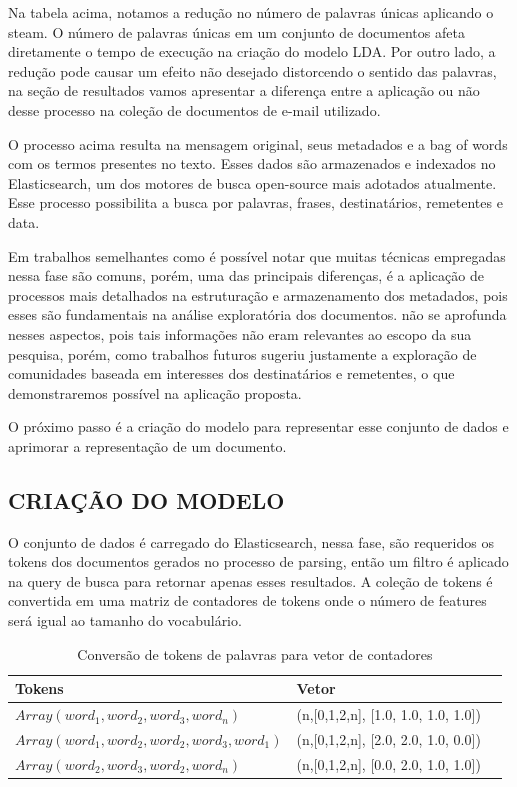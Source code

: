 \documentclass[12pt,a4paper]{article}
\begin{document}
\begin{enumerate}
  Na tabela acima, notamos a redução no número de palavras únicas aplicando o steam. O número de palavras únicas em um conjunto de documentos afeta diretamente o tempo de execução na criação do modelo LDA.
   Por outro lado, a redução pode causar um efeito não desejado distorcendo o sentido das palavras,
   na seção de resultados vamos apresentar a diferença entre a aplicação ou não desse processo na coleção de documentos de e-mail utilizado.
  \end{enumerate}
  
  
  O processo acima resulta na mensagem original, seus metadados e a bag of words com os termos presentes no texto. Esses dados são armazenados e indexados no Elasticsearch,
   um dos motores de busca open-source mais adotados atualmente. Esse processo possibilita a busca por palavras, frases, destinatários, remetentes e data. 
  
  Em trabalhos semelhantes como  é possível notar que muitas técnicas empregadas nessa fase são comuns, porém, uma das principais diferenças,
   é a aplicação de processos mais detalhados na estruturação e armazenamento dos metadados, pois esses são fundamentais na análise exploratória dos documentos.
    não se aprofunda nesses aspectos, pois tais informações não eram relevantes ao escopo da sua pesquisa,
   porém, como trabalhos futuros sugeriu justamente a exploração de comunidades baseada em interesses dos destinatários e remetentes, o que demonstraremos possível na aplicação proposta.
  
  O próximo passo é a criação do modelo para representar esse conjunto de dados e aprimorar a representação de um documento.
  
  
  
  \subsection{CRIAÇÃO DO MODELO}
  O conjunto de dados é carregado do Elasticsearch, nessa fase, são requeridos os tokens dos documentos gerados no processo de parsing, então
   um filtro é aplicado na query de busca para retornar apenas esses resultados. A coleção de tokens é convertida em uma matriz de contadores de tokens onde o número de features será igual ao tamanho do vocabulário.
  
  
  \begin{table}[h]
    \centering
    \begin{tabular}{l l l}
    Tokens		&Vetor &\\
    \hline
    $Array(word_1, word_2, word_3, word_n)$						&(n,[0,1,2,n], [1.0, 1.0, 1.0, 1.0]) &\\
    $Array(word_1, word_2, word_2, word_3, word_1)$				&(n,[0,1,2,n], [2.0, 2.0, 1.0, 0.0]) &\\
    $Array(word_2, word_3, word_2, word_n)$						&(n,[0,1,2,n], [0.0, 2.0, 1.0, 1.0]) &\\
    \hline
    \end{tabular}
    \caption{Conversão de tokens de palavras para vetor de contadores}
  \end{table}
  
\end{document}
